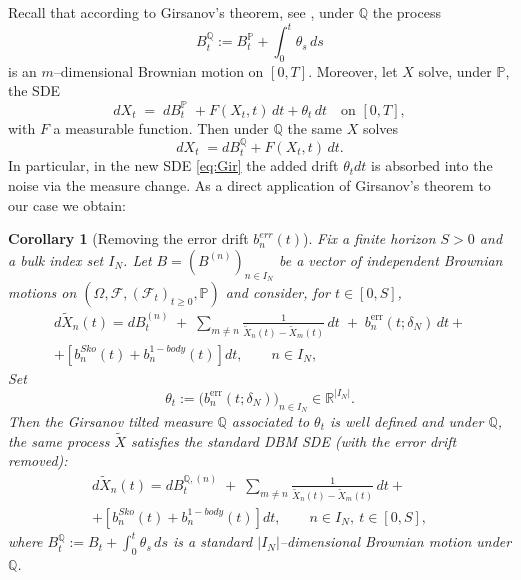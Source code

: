 \documentclass[12pt,reqno]{amsart}
\theoremstyle{plain}
\newtheorem{cor}[prop]{Corollary}
\theoremstyle{definition}
\theoremstyle{remark}
\begin{document}
Recall that according to Girsanov's theorem, see \cite{OK}, under $\mathbb Q$ the process
\begin{equation}
B^{\mathbb Q}_t:=B^{\mathbb{P}}_t+\int_0^t\theta_s\,ds
\end{equation}
is an $m$–dimensional Brownian motion on $[0,T]$. Moreover, let $X$ solve, under $\mathbb P$, the SDE 
\begin{equation}
dX_t \;=\; dB^{\mathbb{P}}_t \;+F(X_t,t)\,dt+\theta_t\,dt
\quad\text{on }[0,T],
\end{equation} 
with $F$ a measurable function.
Then under $\mathbb Q$ the same $X$ solves
\begin{equation}
\label{eq:Gir}
dX_t \;=dB^{\mathbb Q}_t +F(X_t,t)\,dt.
\end{equation}
In particular, in the new SDE \eqref{eq:Gir} the added drift $\theta_t dt$ is absorbed into the noise via the measure change. As a direct application of Girsanov's theorem to our case we obtain: 
\begin{cor}[Removing the error drift $b_n^{err}(t)$]\label{thm:girsanov-clean}
Fix a finite horizon $S>0$ and a bulk index set $I_N$.  
Let $B=(B^{(n)})_{n\in I_N}$ be a vector of independent Brownian motions on
$(\Omega,\mathcal F,(\mathcal F_t)_{t\ge0},\mathbb P)$ and consider, for $t\in[0,S]$,
\begin{multline}\label{eq:DBM-plus-err}
d\widetilde X_n(t)
= dB^{(n)}_t \;+\; \sum_{m\neq n}\frac{1}{\widetilde X_n(t)-\widetilde X_m(t)}\,dt
\;+\; b^{\mathrm{err}}_{n}(t ; \delta_N)\,dt + \\ + \left [ b_n^{Sko}(t)+b_n^{1-body}(t) \right ]dt ,\qquad n\in I_N ,
\end{multline}
Set
\begin{equation}
\theta_t := \big(b^{\mathrm{err}}_{n}(t ; \delta_N)\big)_{n\in I_N}\in\mathbb R^{|I_N|}.
\end{equation}
Then the Girsanov tilted measure $\mathbb Q$ associated to $\theta_t$ is well defined and under $\mathbb Q$, the \emph{same} process $\widetilde X$ satisfies the standard DBM SDE
(with the error drift removed):
\begin{multline}\label{eq:DBM-clean}
d\widetilde X_n(t)
= dB^{\mathbb Q,(n)}_t \;+\; \sum_{m\neq n}\frac{1}{\widetilde X_n(t)-\widetilde X_m(t)}\,dt+ \\ + \left [ b_n^{Sko}(t)+b_n^{1-body}(t) \right ]dt,
\qquad n\in I_N,\ t\in[0,S],
\end{multline}
where $B^{\mathbb Q}_t:=B_t+\int_0^t \theta_s\,ds$ is a standard $|I_N|$–dimensional Brownian
motion under $\mathbb Q$. 
\end{cor}
\end{document}

